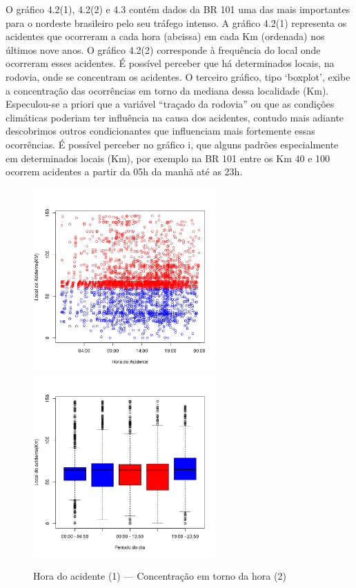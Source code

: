 O gráfico 4.2(1), 4.2(2)  e 4.3 contém dados da BR 101 uma das mais importantes para o nordeste brasileiro pelo seu tráfego intenso. 
A gráfico 4.2(1) representa os acidentes que ocorreram a cada hora (abcissa) em cada Km (ordenada) nos últimos nove anos. 
O  gráfico 4.2(2) corresponde à frequência do local onde ocorreram esses acidentes. 
É possível perceber que há determinados locais, na rodovia, onde se concentram os acidentes. 
O terceiro gráfico, tipo ‘boxplot’, exibe a concentração das ocorrências em torno da mediana dessa localidade (Km). 
Especulou-se a priori que a variável “traçado da rodovia” ou que as condições climáticas poderiam ter influência na causa dos acidentes, contudo mais adiante descobrimos outros condicionantes que influenciam mais fortemente essas ocorrências. 
É possível perceber no gráfico i, que alguns padrões especialmente em determinados locais (Km), por exemplo na BR 101 entre os Km 40 e 100 ocorrem acidentes a partir da 05h da manhã até as 23h. 



\begin{figure}[h]
	\caption{Hora do acidente (1) --- Concentração em torno da hora (2) }
	\includegraphics[width=7cm,height=7cm]{Figuras/Preprocess/br104_1.png}
	\includegraphics[width=7cm,height=7cm]{Figuras/Preprocess/br104_2.png}

\end{figure}

